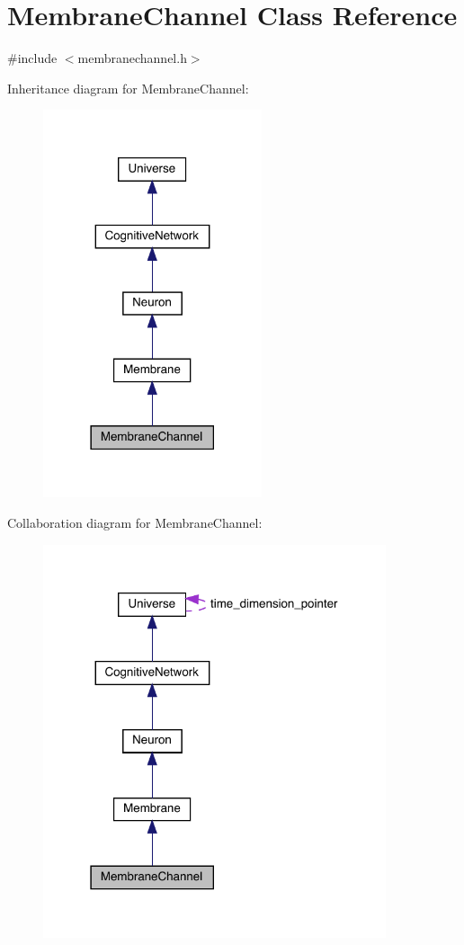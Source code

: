 \hypertarget{class_membrane_channel}{}\section{Membrane\+Channel Class Reference}
\label{class_membrane_channel}


{\ttfamily \#include $<$membranechannel.\+h$>$}



Inheritance diagram for Membrane\+Channel\+:\nopagebreak
\begin{figure}[H]
\begin{center}
\leavevmode
\includegraphics[width=182pt]{class_membrane_channel__inherit__graph}
\end{center}
\end{figure}


Collaboration diagram for Membrane\+Channel\+:
\nopagebreak
\begin{figure}[H]
\begin{center}
\leavevmode
\includegraphics[width=286pt]{class_membrane_channel__coll__graph}
\end{center}
\end{figure}
